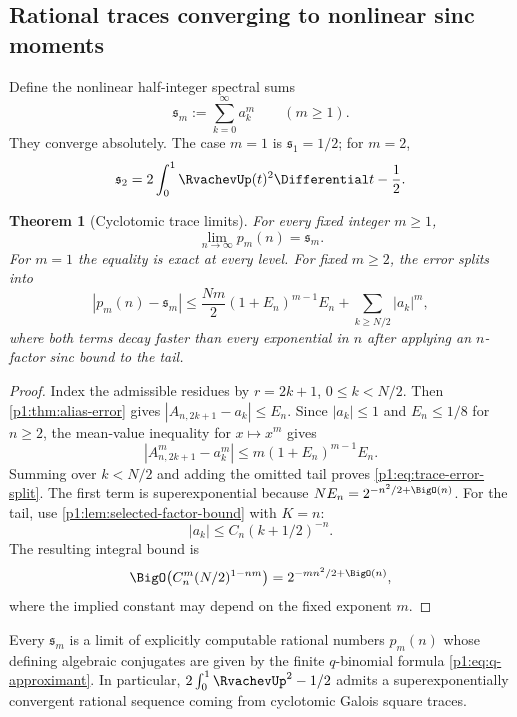 \documentclass[11pt,oneside]{article}
\newtheorem{theorem}{Theorem}[section]
\theoremstyle{definition}
\theoremstyle{remark}
\newcommand{\SpectralPowerSum}[1]{\mathfrak{s}_{#1}}
\begin{document}
\subsection{Rational traces converging to nonlinear sinc moments}

Define the nonlinear half-integer spectral sums
\begin{equation}\label{p1:eq:spectral-power-sums}
 \SpectralPowerSum{m}:=\sum_{k=0}^{\infty}a_k^m
 \qquad(m\ge1).
\end{equation}
They converge absolutely.  The case $m=1$ is $\SpectralPowerSum{1}=1/2$; for $m=2$,
\begin{equation}\label{p1:eq:s2-L2}
 \SpectralPowerSum{2}=2\int_0^1\RvachevUp(t)^2\Differential t-\frac12.
\end{equation}

\begin{theorem}[Cyclotomic trace limits]\label{p1:thm:trace-limits}
For every fixed integer $m\ge1$,
\begin{equation}\label{p1:eq:trace-limit}
 \boxed{
 \lim_{n\to\infty}p_m(n)=\SpectralPowerSum{m}.}
\end{equation}
For $m=1$ the equality is exact at every level.  For fixed $m\ge2$, the error
splits into
\begin{equation}\label{p1:eq:trace-error-split}
 |p_m(n)-\SpectralPowerSum{m}|
 \le \frac{Nm}{2}(1+E_n)^{m-1}E_n
 +\sum_{k\ge N/2}|a_k|^m,
\end{equation}
where both terms decay faster than every exponential in $n$ after applying an
$n$-factor sinc bound to the tail.
\end{theorem}

\begin{proof}
Index the admissible residues by $r=2k+1$, $0\le k<N/2$.  Then
\cref{p1:thm:alias-error} gives
$|A_{n,2k+1}-a_k|\le E_n$.  Since $|a_k|\le1$ and $E_n\le1/8$ for $n\ge2$,
the mean-value inequality for $x\mapsto x^m$ gives
\[
 |A_{n,2k+1}^m-a_k^m|
 \le m(1+E_n)^{m-1}E_n.
\]
Summing over $k<N/2$ and adding the omitted tail proves
\eqref{p1:eq:trace-error-split}.  The first term is superexponential because
$NE_n=2^{-n^2/2+\BigO(n)}$.  For the tail, use
\cref{p1:lem:selected-factor-bound} with $K=n$:
\[
 |a_k|\le C_n(k+1/2)^{-n}.
\]
The resulting integral bound is
\[
 \BigO\!\left(C_n^m(N/2)^{1-nm}\right)
 =2^{-mn^2/2+\BigO(n)},
\]
where the implied constant may depend on the fixed exponent $m$.
\end{proof}

\begin{corollary}\label{p1:cor:algebraic-spectral-norms}
Every $\SpectralPowerSum{m}$ is a limit of explicitly computable rational numbers
$p_m(n)$ whose defining algebraic conjugates are given by the finite
$q$-binomial formula \eqref{p1:eq:q-approximant}.  In particular,
$2\int_0^1\RvachevUp^2-1/2$ admits a superexponentially convergent rational sequence
coming from cyclotomic Galois square traces.
\end{corollary}
\end{document}

